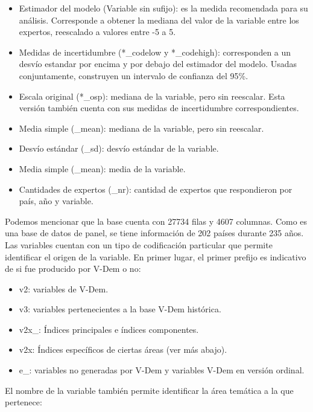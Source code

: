 \documentclass{article}
\begin{document}
\begin{itemize}
  \item Estimador del modelo (Variable sin sufijo): es la medida
   recomendada para su análisis. Corresponde a obtener la mediana del valor de 
   la variable entre los expertos, reescalado a valores entre -5 a 5.
  \item Medidas de incertidumbre (*\_codelow y *\_codehigh): corresponden a un 
  desvío estandar por encima y por debajo del estimador del modelo. 
  Usadas conjuntamente, construyen un intervalo de confianza del 95\%.
  \item Escala original (*\_osp): mediana de la variable, pero sin reescalar. Esta
  versión también cuenta con sus medidas de incertidumbre correspondientes.
  \item Media simple (\_mean): mediana de la variable, pero sin reescalar.
  \item Desvío estándar (\_sd): desvío estándar de la variable.
  \item Media simple (\_mean): media de la variable.
  \item Cantidades de expertos (\_nr): cantidad de expertos que respondieron por
  país, año y variable.
\end{itemize}

Podemos mencionar que la base cuenta con 27734 filas y 4607 columnas. Como es una 
base de datos de panel, se tiene información de 202 países durante 235 años. Las 
variables cuentan con un tipo de codificación particular que permite identificar el 
origen de la  variable. En primer lugar, el primer prefijo es indicativo de si fue 
producido por V-Dem o no:

\begin{itemize}
  \item v2: variables de V-Dem.
  \item v3: variables pertenecientes a la base V-Dem histórica.
  \item v2x\_: Índices principales e índices componentes.
  \item v2x: Índices específicos de ciertas 
  áreas (ver más abajo).
  \item e\_: variables no generadas por V-Dem y variables V-Dem en versión ordinal.
\end{itemize}

El nombre de la variable también permite identificar la área temática a la que 
pertenece:
\end{document}
